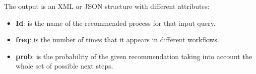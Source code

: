 The output is an XML or JSON structure with different attributes:
\begin{itemize}
\item \textbf{Id}: is the name of the recommended process for that input query.
\item \textbf{freq}:  is the number of times that it appears in different workflows.
\item \textbf{prob}:  is the probability of the given recommendation taking into account the whole set of possible next steps.
\end{itemize}